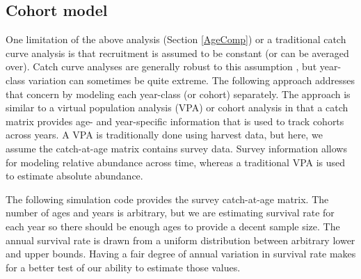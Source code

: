 \documentclass[
]{krantz}
\begin{document}
\hypertarget{Cohort}{%
\subsection{Cohort model}\label{Cohort}}

One limitation of the above analysis (Section \ref{AgeComp}) or a traditional catch curve analysis is that recruitment is assumed to be constant (or can be averaged over). Catch curve analyses are generally robust to this assumption \citep{allen_1997}, but year-class variation can sometimes be quite extreme. The following approach addresses that concern by modeling each year-class (or cohort) separately. The approach is similar to a virtual population analysis (VPA) or cohort analysis \citep{ricker1975} in that a catch matrix provides age- and year-specific information that is used to track cohorts across years. A VPA is traditionally done using harvest data, but here, we assume the catch-at-age matrix contains survey data. Survey information allows for modeling relative abundance across time, whereas a traditional VPA is used to estimate absolute abundance.

The following simulation code provides the survey catch-at-age matrix. The number of ages and years is arbitrary, but we are estimating survival rate for each year so there should be enough ages to provide a decent sample size. The annual survival rate is drawn from a uniform distribution between arbitrary lower and upper bounds. Having a fair degree of annual variation in survival rate makes for a better test of our ability to estimate those values.
\end{document}
